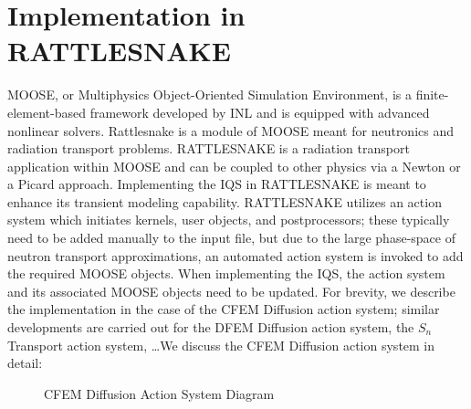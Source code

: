\documentclass[12pt]{article}
\begin{document}
\section{Implementation in RATTLESNAKE}
\label{sect::implementation}

MOOSE, or Multiphysics Object-Oriented Simulation Environment, is a finite-element-based  framework developed by INL and is equipped with advanced nonlinear solvers.  Rattlesnake is a module of MOOSE meant for neutronics and radiation transport problems.  RATTLESNAKE is a radiation transport application within MOOSE and can be coupled to other physics via a Newton or a Picard approach. Implementing the IQS in RATTLESNAKE is meant to enhance its transient modeling capability.  RATTLESNAKE utilizes an action system which initiates kernels, user objects, and postprocessors; these typically need to be added manually to the input file, but due to the large phase-space of neutron transport approximations, an automated action system is invoked to add the required MOOSE objects. When implementing the IQS, the action system and its associated MOOSE objects need to be updated. For brevity, we describe the implementation in the case of the CFEM Diffusion action system; similar developments are carried out for the DFEM Diffusion action system, the $S_n$ Transport action system, \ldots We discuss the CFEM Diffusion action system in detail: 

\begin{figure}[h]
\caption{CFEM Diffusion Action System Diagram}   
\label{Action}
\end{figure} 
\end{document}
